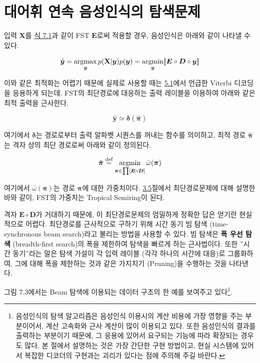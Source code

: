 \documentclass[../main.tex]{subfiles}
\begin{document}
\section{대어휘 연속 음성인식의 탐색문제}

입력 $\mathbf{X}$를 \hyperref[eq:7_1]{식 7.1}과 같이 FST $\bm{E}$로써 적용할 경우, 음성인식은 아래와 같이 나타낼 수 있다. 

\begin{equation}\label{eq:7_5}
    \hat{\bm{y}} = \operatorname*{argmax}_{\bm{y}} p( \mathbf{X} | \bm{y} ) p ( \bm{y} ) = \operatorname*{argmin}_{\bm{y}} [\![\bm{E} \circ \bm{D} \circ \bm{y}]\!]
\end{equation}

이와 같은 최적화는 어렵기 때문에 실제로 사용할 때는 \hyperref[sec:HMM]{5.1}에서 언급한 Viterbi 디코딩을 응용하게 되는데, FST의 최단경로에 대응하는 출력 레이블을 이용하여 아래와 같은 최적 출력을 근사한다. 

\begin{equation}\label{eq:7_6}
    \hat{\bm{y}} \simeq \bm{\delta}(\hat{\bm{\pi}})
\end{equation}

여기에서 $\bm{\delta}$는 경로로부터 출력 알파벳 시퀀스를 꺼내는 함수를 의미하고, 최적 경로 $\hat{\bm{\pi}}$는 격자 상의 최단 경로로써 아래와 같이 정의된다. 

\begin{equation}
    \hat{\bm{\pi}} \stackrel{\text{def}}{=} \operatorname*{argmin}_{\bm{\pi} \in \prod [ \bm{E} \circ \bm{D}] } \bar{\omega}(\bm{\pi})
\end{equation}

여기에서 $\bar{\omega} ( \bm{\pi})$는 경로 $\bm{\pi}$에 대한 가중치이다. 
\hyperref[sec:shortest-path]{3.5}절에서 최단경로문제에 대해 설명한 바와 같이, FST의 가중치는 Tropical Semiring이 된다. 

격자 $\bm{E} \circ \bm{D}$가 거대하기 때문에, 이 최단경로문제의 엄밀하게 정확한 답은 얻기란 현실적으로 어렵다. 
최단경로를 근사적으로 구하기 위해 시간 동기 빔 탐색 (time-synchronous beam search)라고 불리는 방법을 사용할 수 있다. 
빔 탐색은 \textbf{폭 우선 탐색} (breadth-first search)의 폭을 제한하여 탐색을 빠르게 하는 근사법이다. 
또한 ”시간 동기”라는 말은 탐색 가설이 각 입력 레이블 (각각 하나의 시간에 대응)로 그룹화하여, 그에 대해 폭을 제한하는 것과 같은 가지치기 (Pruning)을 수행하는 것을 나타낸다. 

그림 7.3에서는 Beam 탐색에 이용되는 데이터 구조의 한 예를 보여주고 있다\footnote{음성인식의 탐색 알고리즘은 음성인식 이용시의 계산 비용에 가장 영향을 주는 부분이어서, 계산 고속화와 근사 계산이 많이 이용되고 있다. 또한 음성인식의 결과를 출력하는 부분이기 때문에, 그 응용에 있어서 요구되는 기능에 따라 확장되는 경우도 많다. 본 절에서 설명하는 것은 가장 간단한 구현 방법이고, 현실 시스템에 있어서 복잡한 디코더의 구현과는 괴리가 있다는 점에 주의해 주길 바란다.}. 
\end{document}
